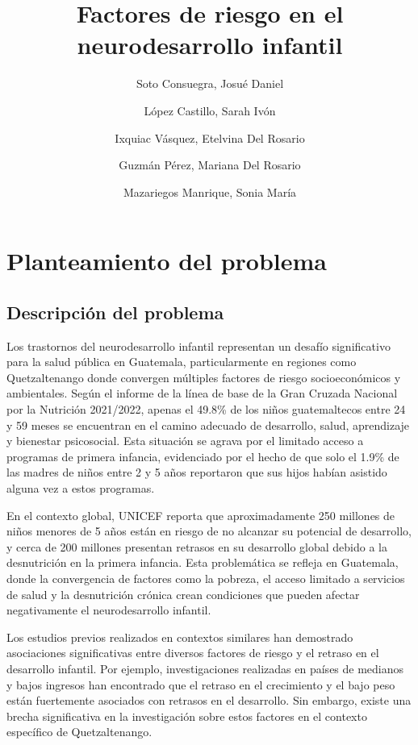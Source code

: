\documentclass[11pt,letterpaper]{report}
\title{Factores de riesgo en el neurodesarrollo infantil}
\author{Soto Consuegra, Josué Daniel \and López Castillo, Sarah Ivón \and
Ixquiac Vásquez, Etelvina Del Rosario \and Guzmán Pérez, Mariana Del Rosario
\and Mazariegos Manrique, Sonia María}
\begin{document}
	\tableofcontents
	\chapter{Planteamiento del problema}
\section{Descripción del problema}
Los trastornos del neurodesarrollo infantil representan un desafío
significativo para la salud pública en Guatemala, particularmente en regiones
como Quetzaltenango donde convergen múltiples factores de riesgo
socioeconómicos y ambientales. Según el informe de la línea de base de la Gran
Cruzada Nacional por la Nutrición 2021/2022, apenas el 49.8\% de los niños
guatemaltecos entre 24 y 59 meses se encuentran en el camino adecuado de
desarrollo, salud, aprendizaje y bienestar psicosocial. Esta situación se
agrava por el limitado acceso a programas de primera infancia, evidenciado por
el hecho de que solo el 1.9\% de las madres de niños entre 2 y 5 años
reportaron que sus hijos habían asistido alguna vez a estos programas.
\cite{SESAN2022}

En el contexto global, UNICEF reporta que aproximadamente 250 millones de niños
menores de 5 años están en riesgo de no alcanzar su potencial de desarrollo, y
cerca de 200 millones presentan retrasos en su desarrollo global debido a la
desnutrición en la primera infancia. \cite{UNICEF2023} Esta problemática se
refleja en Guatemala, donde la convergencia de factores como la pobreza, el
acceso limitado a servicios de salud y la desnutrición crónica crean
condiciones que pueden afectar negativamente el neurodesarrollo infantil.

Los estudios previos realizados en contextos similares han demostrado
asociaciones significativas entre diversos factores de riesgo y el retraso en
el desarrollo infantil. Por ejemplo, investigaciones realizadas en países de
medianos y bajos ingresos han encontrado que el retraso en el crecimiento y el
bajo peso están fuertemente asociados con retrasos en el desarrollo. Sin
embargo, existe una brecha significativa en la investigación sobre estos
factores en el contexto específico de Quetzaltenango.
\end{document}
